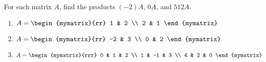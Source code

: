 \documentclass{ximera}
\author{Zack Reed}
\begin{document}
\begin{problem}
  For each matrix $A$, find the products $(-2)A$, $0A$, and $512A$.
  \begin{enumerate}
  \item
    $A = \begin{mymatrix}{rr}
      1 & 2 \\
      2 & 1
    \end{mymatrix}$
  \item
    $A = \begin{mymatrix}{rr}
      -2 & 3 \\
      0 & 2
    \end{mymatrix}$
  \item
    $A = \begin{mymatrix}{rrr}
      0 & 1 & 2 \\
      1 & -1 & 3 \\
      4 & 2 & 0
    \end{mymatrix}$
  \end{enumerate}
\end{problem}
\end{document}
